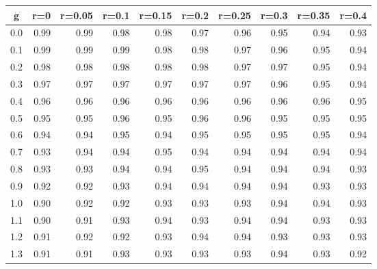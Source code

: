 %
\begin{table}[!tbp]
 \begin{center}
 \begin{tabular}{rrrrrrrrrr}\hline\hline
\multicolumn{1}{c}{g}&\multicolumn{1}{c}{r=0}&\multicolumn{1}{c}{r=0.05}&\multicolumn{1}{c}{r=0.1}&\multicolumn{1}{c}{r=0.15}&\multicolumn{1}{c}{r=0.2}&\multicolumn{1}{c}{r=0.25}&\multicolumn{1}{c}{r=0.3}&\multicolumn{1}{c}{r=0.35}&\multicolumn{1}{c}{r=0.4}\tabularnewline
\hline
0.0&0.99&0.99&0.98&0.98&0.97&0.96&0.95&0.94&0.93\tabularnewline
0.1&0.99&0.99&0.99&0.98&0.98&0.97&0.96&0.95&0.94\tabularnewline
0.2&0.98&0.98&0.98&0.98&0.98&0.97&0.97&0.95&0.94\tabularnewline
0.3&0.97&0.97&0.97&0.97&0.97&0.97&0.96&0.95&0.94\tabularnewline
0.4&0.96&0.96&0.96&0.96&0.96&0.96&0.96&0.96&0.95\tabularnewline
0.5&0.95&0.95&0.96&0.95&0.96&0.96&0.95&0.95&0.95\tabularnewline
0.6&0.94&0.94&0.95&0.94&0.95&0.95&0.95&0.95&0.94\tabularnewline
0.7&0.93&0.94&0.94&0.95&0.94&0.94&0.94&0.94&0.94\tabularnewline
0.8&0.93&0.93&0.94&0.94&0.95&0.94&0.94&0.94&0.93\tabularnewline
0.9&0.92&0.92&0.93&0.94&0.94&0.94&0.94&0.93&0.93\tabularnewline
1.0&0.90&0.92&0.92&0.93&0.93&0.93&0.94&0.94&0.93\tabularnewline
1.1&0.90&0.91&0.93&0.94&0.93&0.94&0.94&0.93&0.93\tabularnewline
1.2&0.91&0.92&0.92&0.93&0.94&0.94&0.93&0.93&0.93\tabularnewline
1.3&0.91&0.91&0.93&0.93&0.93&0.93&0.94&0.93&0.92\tabularnewline
\hline
\end{tabular}

\end{center}

\end{table}

